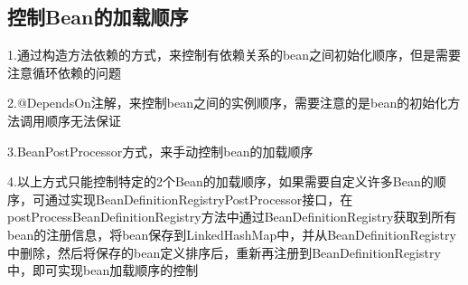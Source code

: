 \documentclass[../../../interview-questions.tex]{subfiles}
\begin{document}
\subsection{控制Bean的加载顺序}

1.通过构造方法依赖的方式，来控制有依赖关系的bean之间初始化顺序，但是需要注意循环依赖的问题

2.@DependsOn注解，来控制bean之间的实例顺序，需要注意的是bean的初始化方法调用顺序无法保证

3.BeanPostProcessor方式，来手动控制bean的加载顺序

4.以上方式只能控制特定的2个Bean的加载顺序，如果需要自定义许多Bean的顺序，可通过实现BeanDefinitionRegistryPostProcessor接口，在postProcessBeanDefinitionRegistry方法中通过BeanDefinitionRegistry获取到所有bean的注册信息，将bean保存到LinkedHashMap中，并从BeanDefinitionRegistry中删除，然后将保存的bean定义排序后，重新再注册到BeanDefinitionRegistry中，即可实现bean加载顺序的控制

\begin{lstlisting}[language=Java]
    
\end{lstlisting}
\end{document}
